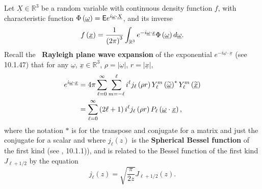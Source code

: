 \documentclass[preprint,11pt,a4paper]{elsarticle}
\begin{document}
Let $\underline{X}\in\mathbb{R}^{3}$ be a random variable with continuous
density function $f$, with characteristic function $\Phi\left( \underline{%
\omega}\right) =\mathsf{E}e^{i\underline{\omega}\cdot \underline{X}}$, and
its inverse%
\begin{equation*}
f\left( \underline{x}\right) =\frac{1}{\left( 2\pi\right) ^{3}}\int_{\mathbb{%
R}^{3}}e^{-i\underline{\omega}\cdot\underline{x}}\Phi\left( \underline{\omega%
}\right) d\underline{\omega}.
\end{equation*}
Recall the \textbf{\ Rayleigh plane wave expansion } of the exponential $%
e^{-i\underline{\omega}\cdot\underline{x}}$ (see \cite{Abramowit12} 10.1.47)
that for any $\underline{\omega}$, $\underline{x}\in\mathbb{R}^{3}$, $%
\rho=\left\vert \underline{\omega}\right\vert $, $r=\left\vert \underline{x}%
\right\vert $, 
\begin{align}
e^{i\underline{\omega}\cdot\underline{x}} &
=4\pi\sum_{\ell=0}^{\infty}\sum_{m=-\ell}^{\ell}i^{\ell}j_{\ell}\left( \rho
r\right) Y_{\ell}^{m}\left( \underline{\widetilde{\omega}}\right)
^{\ast}Y_{\ell}^{m}\left( \underline{\widetilde{x}}\right)
\label{Rayleigh_wave} \\
& =\sum_{\ell=0}^{\infty}\left( 2\ell+1\right) i^{\ell}j_{\ell}\left( \rho
r\right) P_{\ell}\left( \underline{\omega}\cdot\underline{x}\right) ,  \notag
\end{align}
where the notation $\ast$ is for the transpose and conjugate for a matrix
and just the conjugate for a scalar and where $j_{\ell}\left( z\right) $ is
the \textbf{Spherical Bessel function} of the first kind (see \cite%
{Abramowit12}, 10.1.1)), and is related to the Bessel function of the first
kind $J_{\ell+1/2}$ by the equation 
\begin{equation}
j_{\ell}\left( z\right) =\sqrt{\frac{\pi}{2z}}J_{\ell+1/2}\left( z\right) .
\label{SphericalBessel}
\end{equation}
\end{document}
